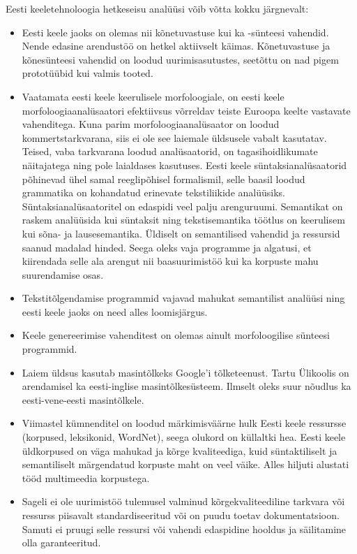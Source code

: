 \begin{multicols}{2}
Eesti keeletehnoloogia hetkeseisu analüüsi võib võtta kokku järgnevalt:
\begin{itemize}
  \item Eesti keele jaoks on olemas nii kõnetuvastuse kui ka -sünteesi vahendid. 
Nende edasine arendustöö on hetkel aktiivselt käimas. 
Kõnetuvastuse ja kõnesünteesi vahendid on loodud uurimisasutustes, seetõttu on nad pigem prototüübid kui valmis tooted.
  \item Vaatamata eesti keele keerulisele morfoloogiale, on eesti keele morfoloogiaanalüsaatori efektiivsus võrreldav teiste Euroopa keelte vastavate vahenditega. 
Kuna parim morfoloogiaanalüsaator on loodud kommertstarkvarana, siis ei ole see laiemale üldsusele vabalt kasutatav. 
Teised, vaba tarkvarana loodud analüsaatorid, on tagasihoidlikumate näitajatega ning pole laialdases kasutuses. 
Eesti keele süntaksianalüsaatorid põhinevad ühel samal reeglipõhisel formalismil, selle baasil loodud grammatika on kohandatud erinevate tekstiliikide analüüsiks. 
Süntaksianalüsaatoritel on edaspidi veel palju arenguruumi. 
Semantikat on raskem analüüsida kui süntaksit ning tekstisemantika töötlus on keerulisem kui sõna- ja lausesemantika. 
Üldiselt on semantilised vahendid ja ressursid saanud madalad hinded. 
Seega oleks vaja programme ja algatusi, et kiirendada selle ala arengut nii baasuurimistöö kui ka korpuste mahu suurendamise osas. 
  \item Tekstitõlgendamise programmid vajavad mahukat semantilist analüüsi ning eesti keele jaoks on need alles loomisjärgus.
  \item Keele genereerimise vahenditest on olemas ainult morfoloogilise sünteesi programmid.
  \item Laiem üldsus kasutab masintõlkeks Google'i tõlketeenust. Tartu Ülikoolis on arendamisel ka eesti-inglise masintõlkesüsteem. Ilmselt oleks suur nõudlus ka eesti-vene-eesti masintõlkele.
  \item Viimastel kümnenditel on loodud märkimisväärne hulk Eesti keele ressursse (korpused, leksikonid, WordNet), seega olukord on küllaltki hea. Eesti keele üldkorpused on väga mahukad ja kõrge kvaliteediga, kuid süntaktiliselt ja semantiliselt märgendatud korpuste maht on veel väike. Alles hiljuti alustati tööd multimeedia korpustega. 
  \item Sageli ei ole uurimistöö tulemusel valminud kõrgekvaliteediline tarkvara või ressurss piisavalt standardiseeritud või on puudu toetav dokumentatsioon. Samuti ei pruugi selle ressursi või vahendi edaspidine hooldus ja säilitamine olla garanteeritud. 
\end{itemize}


\end{multicols}
